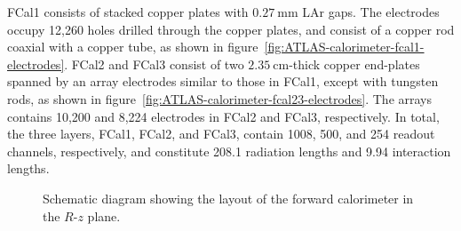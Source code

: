 FCal1 consists of stacked copper plates with $\SI{0.27}{\milli\meter}$ LAr gaps. The electrodes occupy 12,260 holes drilled through the copper plates, and consist of a copper rod coaxial with a copper tube, as shown in figure~\ref{fig:ATLAS-calorimeter-fcal1-electrodes}. FCal2 and FCal3 consist of two $\SI{2.35}{\centi\meter}$-thick copper end-plates spanned by an array electrodes similar to those in FCal1, except with tungsten rods, as shown in figure~\ref{fig:ATLAS-calorimeter-fcal23-electrodes}. The arrays contains 10,200 and 8,224 electrodes in FCal2 and FCal3, respectively. In total, the three layers, FCal1, FCal2, and FCal3, contain 1008, 500, and 254 readout channels, respectively, and constitute 208.1 radiation lengths and 9.94 interaction lengths. 

\begin{figure}
	\centering
	\caption{Schematic diagram showing the layout of the forward calorimeter in the $R$-$z$ plane.}
	\label{fig:ATLAS-calorimeters-fcal-layout}
\end{figure}



